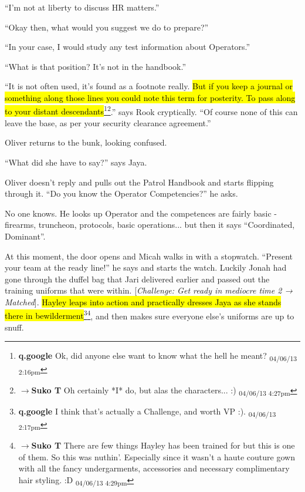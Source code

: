``I'm not at liberty to discuss HR matters.''

``Okay then, what would you suggest we do to prepare?''

``In your case, I would study any test information about Operators.''

``What is that position?  It's not in the handbook.''

``It is not often used, it's found as a footnote really.  \hl{But if you keep a journal or something along those lines you could note this term for posterity.  To pass along to your distant descendants}\footnote{\textbf{q.google }Ok, did anyone else want to know what the hell he meant? \textsubscript{04/06/13 2:16pm}}\footnote{$\rightarrow$\textbf{Suko T }Oh certainly *I* do, but alas the characters... :) \textsubscript{04/06/13 4:27pm}}.'' says Rook cryptically.  ``Of course none of this can leave the base, as per your security clearance agreement.''



Oliver returns to the bunk, looking confused.

``What did she have to say?'' says Jaya.

Oliver doesn't reply and pulls out the Patrol Handbook and starts flipping through it.  ``Do you know the Operator Competencies?'' he asks.

No one knows.  He looks up Operator and the competences are fairly basic - firearms, truncheon, protocols, basic operations... but then it says ``Coordinated, Dominant''.



At this moment, the door opens and Micah walks in with a stopwatch.  ``Present your team at the ready line!'' he says and starts the watch.  Luckily Jonah had gone through the duffel bag that Jari delivered earlier and passed out the training uniforms that were within.  {[}\textit{Challenge: Get ready in mediocre time 2 → Matched}{]}.  \hl{Hayley leaps into action and practically dresses Jaya as she stands there in bewilderment}\footnote{\textbf{q.google }I think that's actually a Challenge, and worth VP :). \textsubscript{04/06/13 2:17pm}}\footnote{$\rightarrow$\textbf{Suko T }There are few things Hayley has been trained for but this is one of them.  So this was nuthin'.  Especially since it wasn't a haute couture gown with all the fancy undergarments, accessories and necessary complimentary hair styling. :D \textsubscript{04/06/13 4:29pm}}, and then makes sure everyone else's uniforms are up to snuff.




